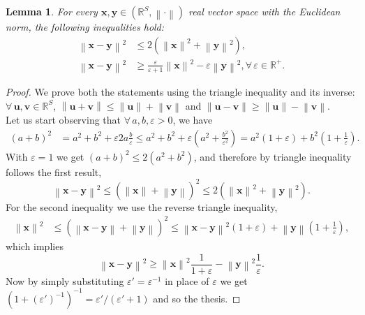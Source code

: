 \documentclass[a4paper, 11pt, reqno]{amsart}
\theoremstyle{plain}
\newtheorem{lemma}[theorem]{Lemma}
\theoremstyle{remark}
\theoremstyle{definition}
\newcommand{\real}{\mathbb{R}}
\newcommand{\norm}[1]{\left\lVert#1\right\rVert}
\let\epsilon\varepsilon
\let\oldforall\forall
\renewcommand{\forall}{\oldforall\,}
\begin{document}
\begin{lemma} \label{lem:norminequalities}
	For every $\bm{x}, \bm{y} \in \left(\real^S, \norm{\cdot}\right)$ real vector space with the Euclidean norm, the following inequalities hold:
	\begin{align}
		\norm{\bm{x} - \bm{y}}^2 & \leq 2 (\norm{\bm{x}}^2 + \norm{\bm{y}}^2), \label{eq:ineqnormsqleq} \\
		\norm{\bm{x} - \bm{y}}^2 & \geq \frac{\epsilon}{\epsilon + 1} \norm{\bm{x}}^2 -\epsilon \norm{\bm{y}}^2, \forall \epsilon \in \real^+ \label{eq:ineqnormsqgeqeps}. 
	\end{align}
\end{lemma}
\begin{proof}
	We prove both the statements using the triangle inequality and its inverse: $\forall \bm{u}, \bm{v} \in \real^S$, $\norm{\bm{u} + \bm{v}} \leq \norm{\bm{u}} + \norm{\bm{v}}$ and $\norm{\bm{u} - \bm{v}} \geq \norm{\bm{u}} - \norm{\bm{v}}$. \\
	Let us start observing that $\forall a, b, \epsilon > 0$, we have
	\begin{equation*}
		\begin{aligned}
			(a + b)^2 & = a^2 + b^2 + \epsilon 2a \frac{b}{\epsilon} \leq a^2 + b^2 + \epsilon \left(a^2 + \frac{b^2}{\epsilon^2}\right) = a^2 \left(1 + \epsilon\right) + b^2 \left(1 + \frac{1}{\epsilon}\right).
		\end{aligned}
	\end{equation*}
	With $\epsilon = 1$ we get $(a + b)^2 \leq 2(a^2 + b^2)$, and therefore by triangle inequality  follows the first result,
	\begin{equation*}
		\norm{\bm{x} - \bm{y}}^2 \leq \left(\norm{\bm{x}} + \norm{\bm{y}}\right)^2 \leq 2 \left(\norm{\bm{x}}^2 + \norm{\bm{y}}^2\right).
	\end{equation*}
	For the second inequality we use the reverse triangle inequality,
	\begin{equation*}
		\begin{aligned}
			\norm{\bm{x}}^2 & \leq \left(\norm{\bm{x} - \bm{y}} + \norm{\bm{y}}\right)^2 \leq \norm{\bm{x} - \bm{y}}^2 (1 + \epsilon) + \norm{\bm{y}} \left(1 + \frac{1}{\epsilon}\right),
		\end{aligned}
	\end{equation*}
	which implies
	\begin{equation*}
		\norm{\bm{x} - \bm{y}}^2 \geq \norm{\bm{x}}^2 \frac{1}{1 + \epsilon} - \norm{\bm{y}}^2 \frac{1}{\epsilon}.
	\end{equation*}
	Now by simply substituting $\epsilon' = \epsilon^{-1}$ in place of $\epsilon$ we get $(1 + (\epsilon')^{-1})^{-1} = \epsilon' / (\epsilon' + 1)$ and so the thesis.
\end{proof}
\end{document}
